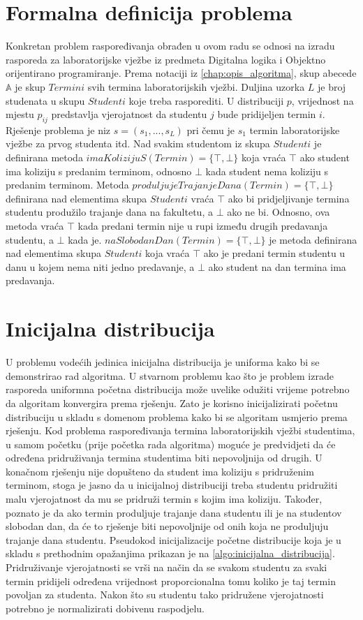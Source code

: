 \documentclass[times, utf8, zavrsni]{fer}
\begin{document}
\section{Formalna definicija problema}
Konkretan problem raspoređivanja obrađen u ovom radu se odnosi na izradu rasporeda za laboratorijske vježbe iz predmeta Digitalna logika
i Objektno orijentirano programiranje. Prema notaciji iz \ref{chap:opis_algoritma}, skup abecede $\mathbb{A}$ je skup $Termini$ svih termina laboratorijskih
vježbi. Duljina uzorka $L$ je broj studenata u skupu $Studenti$ koje treba rasporediti. U distribuciji $p$, vrijednost na mjestu $p_{ij}$ predstavlja
vjerojatnost da studentu $j$ bude pridijeljen termin $i$. Rješenje problema je niz $s=(s_1,...,s_L)$ pri čemu je $s_1$ termin laboratorijske
vježbe za prvog studenta itd. Nad svakim studentom iz skupa $Studenti$ je definirana metoda $imaKolizijuS(Termin) =
\{\top, \bot \}$ koja vraća $\top$ ako student ima koliziju s predanim terminom, odnosno $\bot$ kada student nema koliziju
s predanim terminom. Metoda $produljujeTrajanjeDana(Termin) = \{\top, \bot \}$ definirana nad elementima skupa $Studenti$
vraća $\top$ ako bi pridjeljivanje termina studentu produžilo trajanje dana na fakultetu, a $\bot$ ako ne bi. Odnosno,
ova metoda vraća $\top$ kada predani termin nije u rupi između drugih predavanja studentu, a $\bot$ kada je.
$naSlobodanDan(Termin) = \{\top, \bot \}$ je metoda definirana nad elementima skupa $Studenti$ koja vraća $\top$ ako je
predani termin studentu u danu u kojem nema niti jedno predavanje, a $\bot$ ako student na dan termina ima predavanja.

\section{Inicijalna distribucija}
\label{sec:inicijalna_distribucija}
U problemu vodećih jedinica inicijalna distribucija je uniforma kako bi se demonstrirao rad algoritma. U stvarnom problemu kao što je problem izrade rasporeda
uniformna početna distribucija može uvelike odužiti vrijeme potrebno da algoritam konvergira prema rješenju. Zato je korisno inicijalizirati početnu distribuciju u skladu s
domenom problema kako bi se algoritam usmjerio prema rješenju. Kod problema raspoređivanja termina laboratorijskih vježbi studentima, u samom početku (prije početka rada
algoritma) moguće je predvidjeti da će određena pridruživanja termina studentima biti nepovoljnija od drugih. U konačnom rješenju nije dopušteno da student ima koliziju
s pridruženim terminom, stoga je jasno da u inicijalnoj distribuciji treba studentu pridružiti malu vjerojatnost da mu se pridruži termin s kojim ima koliziju. Također,
poznato je da ako termin produljuje trajanje dana studentu ili je na studentov slobodan dan, da će to rješenje biti nepovoljnije od onih koja ne produljuju trajanje dana
studentu. Pseudokod inicijalizacije početne distribucije koja je u skladu s prethodnim opažanjima prikazan je na \ref{algo:inicijalna_distribucija}. Pridruživanje vjerojatnosti se
vrši na način da se svakom studentu za svaki termin pridijeli određena vrijednost proporcionalna tomu koliko je taj termin povoljan za studenta. Nakon što su studentu tako
pridružene vjerojatnosti potrebno je normalizirati dobivenu raspodjelu.
\end{document}
